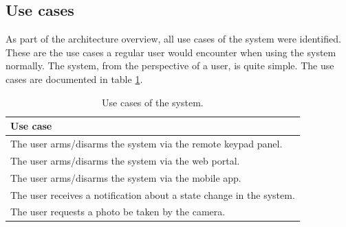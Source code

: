 \subsection{Use cases}
As part of the architecture overview, all use cases of the system were identified. These are the use cases a regular user would encounter when using the system normally. The system, from the perspective of a user, is quite simple. The use cases are documented in table \ref{tb:use-cases}.
\begin{table}[!ht]
    \centering
    \begin{tabular}{l}
        \hline
        \textbf{Use case}
        \\ \hline
        The user arms/disarms the system via the remote keypad panel.
        \\
        The user arms/disarms the system via the web portal.
        \\
        The user arms/disarms the system via the mobile app.
        \\
        The user receives a notification about a state change in the system.
        \\
        The user requests a photo be taken by the camera.
        \\ \hline
    \end{tabular}
    \caption{Use cases of the system.}
    \label{tb:use-cases}
\end{table}


